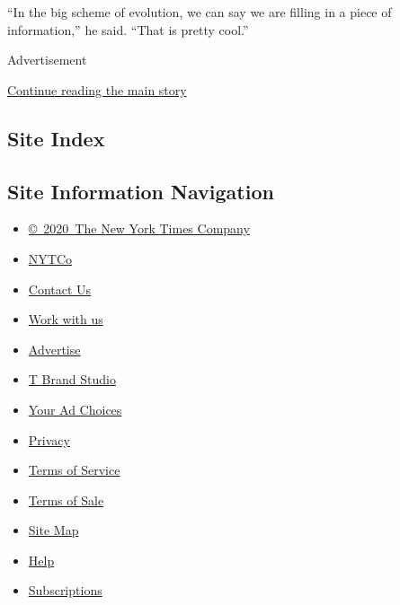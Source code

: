 ``In the big scheme of evolution, we can say we are filling in a piece
of information,'' he said. ``That is pretty cool.''

Advertisement

\protect\hyperlink{after-bottom}{Continue reading the main story}

\hypertarget{site-index}{%
\subsection{Site Index}\label{site-index}}

\hypertarget{site-information-navigation}{%
\subsection{Site Information
Navigation}\label{site-information-navigation}}

\begin{itemize}
\tightlist
\item
  \href{https://help.nytimes3xbfgragh.onion/hc/en-us/articles/115014792127-Copyright-notice}{©~2020~The
  New York Times Company}
\end{itemize}

\begin{itemize}
\tightlist
\item
  \href{https://www.nytco.com/}{NYTCo}
\item
  \href{https://help.nytimes3xbfgragh.onion/hc/en-us/articles/115015385887-Contact-Us}{Contact
  Us}
\item
  \href{https://www.nytco.com/careers/}{Work with us}
\item
  \href{https://nytmediakit.com/}{Advertise}
\item
  \href{http://www.tbrandstudio.com/}{T Brand Studio}
\item
  \href{https://www.nytimes3xbfgragh.onion/privacy/cookie-policy\#how-do-i-manage-trackers}{Your
  Ad Choices}
\item
  \href{https://www.nytimes3xbfgragh.onion/privacy}{Privacy}
\item
  \href{https://help.nytimes3xbfgragh.onion/hc/en-us/articles/115014893428-Terms-of-service}{Terms
  of Service}
\item
  \href{https://help.nytimes3xbfgragh.onion/hc/en-us/articles/115014893968-Terms-of-sale}{Terms
  of Sale}
\item
  \href{https://spiderbites.nytimes3xbfgragh.onion}{Site Map}
\item
  \href{https://help.nytimes3xbfgragh.onion/hc/en-us}{Help}
\item
  \href{https://www.nytimes3xbfgragh.onion/subscription?campaignId=37WXW}{Subscriptions}
\end{itemize}
